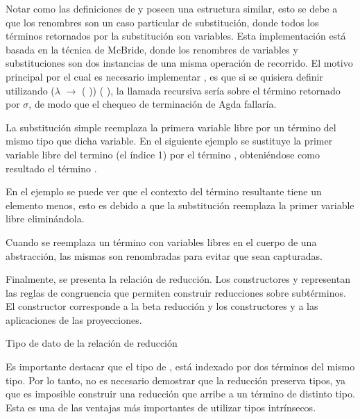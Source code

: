 Notar como las definiciones de  y  poseen una estructura similar, esto se debe a que los renombres son un caso particular de substitución, donde todos los términos retornados por la substitución son variables.
Esta implementación está basada en la técnica de McBride\cite{ren-sub}, donde los renombres de variables y substituciones son dos instancias de una misma operación de recorrido.
El motivo principal por el cual es necesario implementar , es que si se quisiera definir  utilizando  ($\lambda$  $\rightarrow$  ( )) (\bound{$\sigma$} ), la llamada recursiva sería sobre el término retornado por $\sigma$, de modo que el chequeo de terminación de Agda fallaría.

\begin{example}
	La substitución simple reemplaza la primera variable libre por un término del mismo tipo que dicha variable.
	En el siguiente ejemplo se sustituye la primer variable libre del termino  (el índice 1) por el término , obteniéndose como resultado el término .

\end{example}

En el ejemplo se puede ver que el contexto del término resultante tiene un elemento menos, esto es debido a que la substitución reemplaza la primer variable libre eliminándola.

\begin{example}
	Cuando se reemplaza un término con variables libres en el cuerpo de una abstracción, las mismas son renombradas para evitar que sean capturadas.
\end{example}

Finalmente, se presenta la relación de reducción.
Los constructores \const{$\xi$} y \const{$\zeta$} representan las reglas de congruencia que permiten construir reducciones sobre subtérminos.
El constructor  corresponde a la beta reducción y los constructores  y  a las aplicaciones de las proyecciones.

\begin{codigo}
	Tipo de dato de la relación de reducción
	
\end{codigo}

Es importante destacar que el tipo de \type{$\_\hookrightarrow\_$}, está indexado por dos términos del mismo tipo.
Por lo tanto, no es necesario demostrar que la reducción preserva tipos, ya que es imposible construir una reducción que arribe a un término de distinto tipo.
Esta es una de las ventajas más importantes de utilizar tipos intrínsecos.

